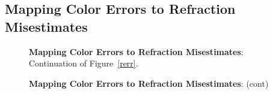 \documentclass[DM,toc]{lsstdoc}
\begin{document}
\subsection{Mapping Color Errors to Refraction Misestimates \label{appx:rerr}}
\begin{figure}[h]
    \centering
    \caption[]{{\bf Mapping Color Errors to Refraction Misestimates}:  Continuation of Figure~\ref{rerr}.}
    \label{rerr2}
\end{figure}
\begin{figure}
    \ContinuedFloat
    \centering
    \caption[]{{\bf Mapping Color Errors to Refraction Misestimates}: (cont)}
    \label{rerr2}
\end{figure}
\end{document}

